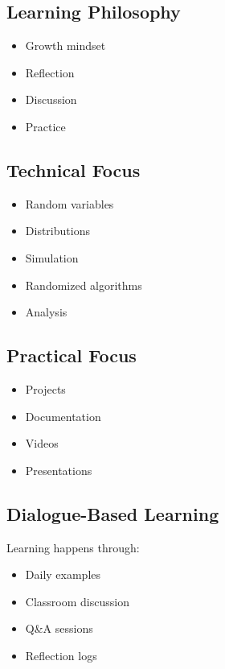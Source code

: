 \documentclass[12pt]{article}
\begin{document}
\subsection{Learning Philosophy}

\begin{itemize}
\item Growth mindset
\item Reflection
\item Discussion
\item Practice
\end{itemize}

\subsection{Technical Focus}

\begin{itemize}
\item Random variables
\item Distributions
\item Simulation
\item Randomized algorithms
\item Analysis
\end{itemize}

\subsection{Practical Focus}

\begin{itemize}
\item Projects
\item Documentation
\item Videos
\item Presentations
\end{itemize}

\subsection{Dialogue-Based Learning}

Learning happens through:

\begin{itemize}
\item Daily examples
\item Classroom discussion
\item Q\&A sessions
\item Reflection logs
\end{itemize}
\end{document}
